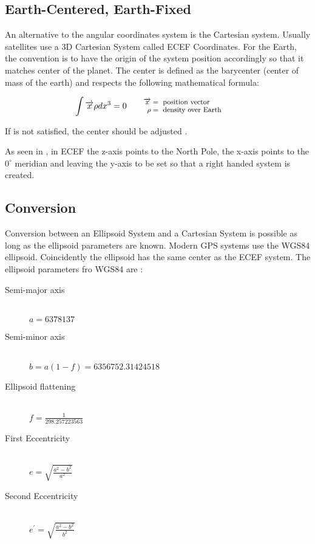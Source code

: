 \subsection{Earth-Centered, Earth-Fixed}
\label{sub-sec:ecef}
An alternative to the angular coordinates system is the Cartesian system. Usually
satellites use a 3D Cartesian System called ECEF
Coordinates. For the Earth,  the convention is to have the origin of the system
position accordingly so that it matches center of the planet. The center is defined as the barycenter 
(center of mass of the earth) and respects the following mathematical formula:

\begin{equation}
\int \overrightarrow {x}\rho dx^{3} = 0
\qquad\parbox{4.0cm}{\footnotesize$\begin{aligned} 
  \overrightarrow {x} &= \text{ position vector}
  \\[-1.0ex] \rho &= \text{ density over Earth}
  \end{aligned}$}
\label{eqn:ecef-int}
\end{equation}

If  is not satisfied, the center should
be adjusted \cite{earth-coordinates}.

As seen in , in ECEF the z-axis points to the North
Pole,  the x-axis points to the $0^{\circ}$ meridian and leaving the y-axis to be
set so that a right handed system is created.
\subsection{Conversion}
\label{sub-sec:lla2ecef}
Conversion between an Ellipsoid System and a Cartesian System is possible 
as long as the ellipsoid parameters are known. Modern GPS systems use 
the WGS84 ellipsoid. Coincidently the ellipsoid has the same center as the ECEF
system. The ellipsoid parameters fro WGS84 are \cite{datum}:


\begin{description}
\item [Semi-major axis] \hfill \\
$a = 6378137$
\item [Semi-minor axis] \hfill \\
$b = a(1-f) = 6356752.31424518$
\item [Ellipsoid flattening] \hfill \\
$ f = \frac{1}{298.257223563}$
\item [First Eccentricity] \hfill \\
$e = \sqrt{\frac{a^{2}-b^{2}}{a^{2}}}$
\item [Second Eccentricity] \hfill \\
$e^{'} = \sqrt{\frac{a^{2}-b^{2}}{b^{2}}}$
\end{description}


